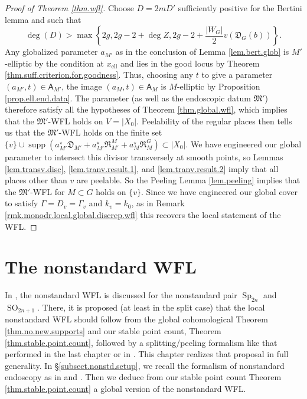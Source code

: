 \documentclass[openany]{amsbook}
\theoremstyle{definition}
\theoremstyle{remark}
\numberwithin{equation}{section}
\renewcommand{\-}{\operatorname{-}}
\newcommand{\on}[1]{\operatorname{#1}}
\newcommand{\Sp}{\on{Sp}}
\newcommand{\bA}{\mathsf{A}}
\newcommand{\fD}{\mathfrak{D}}
\newcommand{\fR}{\mathfrak{R}}
\newcommand{\fM}{\mathfrak{M}}
\begin{document}
\begin{proof}[Proof of Theorem \ref{thm.wfl}]
    Choose $D = 2 m D'$ sufficiently positive for the Bertini lemma and such that
    $$
        \deg(D) > \max \left\{ 2g, 2g - 2 + \deg Z, 2g-2 + \frac{|W_G|}{2} v(\fD_G(b))\right\}.
    $$
    Any globalized parameter $a_{M'}$ as in the conclusion of Lemma \ref{lem.bert.glob} is $M'$-elliptic by the condition at $x_{\mathrm{ell}}$ and lies in the good locus by Theorem \ref{thm.suff.criterion.for.goodness}. Thus, choosing any $t$ to give a parameter $(a_{M'}, t) \in \bA_{M'}$, the image $(a_M, t) \in \bA_M$ is $M$-elliptic by Proposition \ref{prop.ell.end.data}. The parameter (as well as the endoscopic datum $\fM'$) therefore satisfy all the hypotheses of Theorem \ref{thm.global.wfl}, which implies that the $\fM'$-WFL holds on $V = |X_0|$. Peelability of the regular places then tells us that the $\fM'$-WFL holds on the finite set $\{v\} \cup \on{supp}(a_{M'}^\star \fD_{M'} + a_{M'}^\star \fR_{M'}^M + a_M^\star \fR_M^G) \subset |X_0|$. We have engineered our global parameter to intersect this divisor transversely at smooth points, so Lemmas \ref{lem.transv.disc}, \ref{lem.tranv.result.1}, and \ref{lem.tranv.result.2} imply that all places other than $v$ are peelable. So the Peeling Lemma \ref{lem.peeling} implies that the $\fM'$-WFL for $M \subset G$ holds on $\{v\}$. Since we have engineered our global cover to satisfy $\Gamma = D_v = \Gamma_v$ and $k_v = k_0$, as in Remark \ref{rmk.monodr.local.global.discrep.wfl} this recovers the local statement of the WFL. 
\end{proof}





















\chapter{The nonstandard WFL}\label{sect.nonstd}


In \cite{Chaudouardnonstandardexample}, the nonstandard WFL is discussed for the nonstandard pair $\Sp_{2n}$ and $\on{SO}_{2n+1}$. There, it is proposed (at least in the split case) that the local nonstandard WFL should follow from the global cohomological Theorem \ref{thm.no.new.supports} and our stable point count, Theorem \ref{thm.stable.point.count}, followed by a splitting/peeling formalism like that performed in the last chapter or in \cite[\S 16-18]{CLII}. This chapter realizes that proposal in full generality. In \S \ref{subsect.nonstd.setup}, we recall the formalism of nonstandard endoscopy as in \cite{WaldTordu} and \cite{ngofl}. Then we deduce from our stable point count Theorem \ref{thm.stable.point.count} a global version of the nonstandard WFL. 
\end{document}
